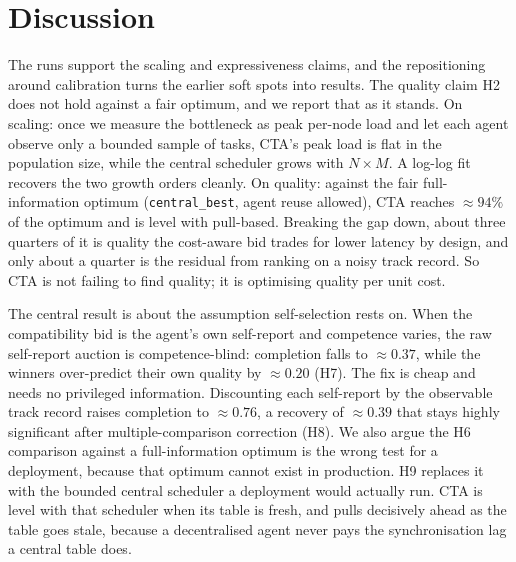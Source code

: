 \documentclass[11pt]{article}
\newcommand{\code}[1]{\texttt{#1}}
\begin{document}
\section{Discussion}

The runs support the scaling and expressiveness claims, and the repositioning around calibration turns the earlier soft spots into results. The quality claim H2 does not hold against a fair optimum, and we report that as it stands. On scaling: once we measure the bottleneck as peak per-node load and let each agent observe only a bounded sample of tasks, CTA's peak load is flat in the population size, while the central scheduler grows with $N\times M$. A log-log fit recovers the two growth orders cleanly. On quality: against the fair full-information optimum (\code{central\_best}, agent reuse allowed), CTA reaches $\approx 94\%$ of the optimum and is level with pull-based. Breaking the gap down, about three quarters of it is quality the cost-aware bid trades for lower latency by design, and only about a quarter is the residual from ranking on a noisy track record. So CTA is not failing to find quality; it is optimising quality per unit cost.

The central result is about the assumption self-selection rests on. When the compatibility bid is the agent's own self-report and competence varies, the raw self-report auction is competence-blind: completion falls to $\approx 0.37$, while the winners over-predict their own quality by $\approx 0.20$ (H7). The fix is cheap and needs no privileged information. Discounting each self-report by the observable track record raises completion to $\approx 0.76$, a recovery of $\approx 0.39$ that stays highly significant after multiple-comparison correction (H8). We also argue the H6 comparison against a full-information optimum is the wrong test for a deployment, because that optimum cannot exist in production. H9 replaces it with the bounded central scheduler a deployment would actually run. CTA is level with that scheduler when its table is fresh, and pulls decisively ahead as the table goes stale, because a decentralised agent never pays the synchronisation lag a central table does.
\end{document}
